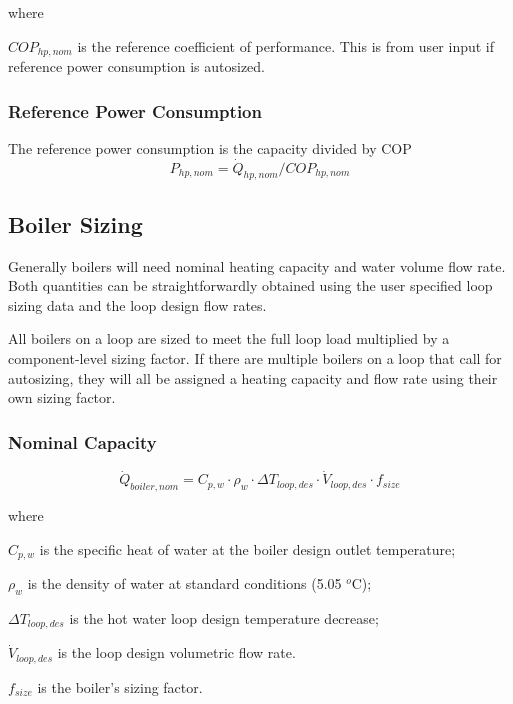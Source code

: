 where

\( COP_{hp,nom} \) is the reference coefficient of performance.  This is from user input if reference power consumption is autosized.

\subsubsection{Reference Power Consumption}\label{wwhp-ref-power-consumption}

The reference power consumption is the capacity divided by COP
\begin{equation}
P_{hp,nom} = \dot Q_{hp,nom} / COP_{hp,nom}
\end{equation}

\subsection{Boiler Sizing}\label{boiler-sizing}

Generally boilers will need nominal heating capacity and water volume flow rate. Both quantities can be straightforwardly obtained using the user specified loop sizing data and the loop design flow rates.

All boilers on a loop are sized to meet the full loop load multiplied by a component-level sizing factor. If there are multiple boilers on a loop that call for autosizing, they will all be assigned a heating capacity and flow rate using their own sizing factor.

\subsubsection{Nominal Capacity}\label{nominal-capacity}

\begin{equation}
\dot Q_{boiler,nom} = C_{p,w} \cdot \rho_w \cdot \Delta T_{loop,des} \cdot \dot V_{loop,des} \cdot f_{size}
\end{equation}

where

\( C_{p,w} \) is the specific heat of water at the boiler design outlet temperature;

\( \rho_w \) is the density of water at standard conditions (5.05 \(^{o}\)C);

\( \Delta T_{loop,des} \) is the hot water loop design temperature decrease;

\( \dot V_{loop,des} \) is the loop design volumetric flow rate.

\( f_{size} \) is the boiler's sizing factor.

